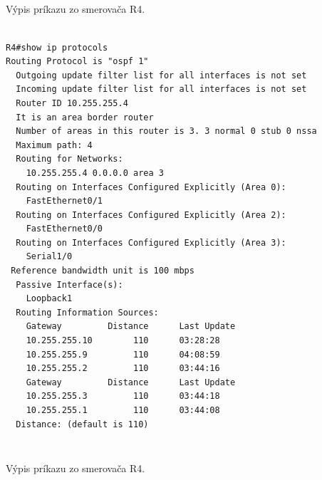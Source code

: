 \documentclass[12pt,twoside,a4paper]{article}
\begin{document}
\subparagraph{}
Výpis príkazu  zo smerovača R4.


\noindent
{\selectfont
\begin{small}
\begin{verbatim}

R4#show ip protocols
Routing Protocol is "ospf 1"
  Outgoing update filter list for all interfaces is not set
  Incoming update filter list for all interfaces is not set
  Router ID 10.255.255.4
  It is an area border router
  Number of areas in this router is 3. 3 normal 0 stub 0 nssa
  Maximum path: 4
  Routing for Networks:
    10.255.255.4 0.0.0.0 area 3
  Routing on Interfaces Configured Explicitly (Area 0):
    FastEthernet0/1
  Routing on Interfaces Configured Explicitly (Area 2):
    FastEthernet0/0
  Routing on Interfaces Configured Explicitly (Area 3):
    Serial1/0
 Reference bandwidth unit is 100 mbps
  Passive Interface(s):
    Loopback1
  Routing Information Sources:
    Gateway         Distance      Last Update
    10.255.255.10        110      03:28:28
    10.255.255.9         110      04:08:59
    10.255.255.2         110      03:44:16
    Gateway         Distance      Last Update
    10.255.255.3         110      03:44:18
    10.255.255.1         110      03:44:08
  Distance: (default is 110)


\end{verbatim}
\end{small}
}


\subparagraph{}
Výpis príkazu  zo smerovača R4.
\end{document}
